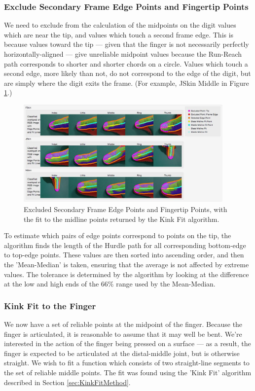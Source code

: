 \subsubsection{Exclude Secondary Frame Edge Points and Fingertip Points }\label{sec:ExcludeSecondaryFrameEdgePointsAndFingertipPoints}
We need to exclude from the calculation of the midpoints on the digit values which are near the tip, and values which touch a second frame edge. This is because values toward the tip --- given that the finger is not necessarily perfectly horizontally-aligned --- give unreliable midpoint values because the Run-Reach path corresponds to shorter and shorter chords on a circle. Values which touch a second edge, more likely than not, do not correspond to the edge of the digit, but are simply where the digit exits the frame. (For example, JSkin Middle in Figure \ref{fig:ExcludedEdgePointsAndMidlineFit}.)

\begin{figure}[h!]
  \centering
    \includegraphics[width=0.95\textwidth]{Chapter4/Figs/ExcludedEdgePointsAndMidlineFit.jpg}
    \caption{Excluded Secondary Frame Edge Points and Fingertip Points, with the fit to the midline points returned by the Kink Fit algorithm.}\label{fig:ExcludedEdgePointsAndMidlineFit}
\end{figure}

To estimate which pairs of edge points correspond to points on the tip, the algorithm finds the length of the Hurdle path for all corresponding bottom-edge to top-edge points. These values are then sorted into ascending order, and then the 'Mean-Median' is taken, ensuring that the average is not affected by extreme values. The tolerance is determined by the algorithm by looking at the difference at the low and high ends of the $66\%$ range used by the Mean-Median.

\subsubsection{Kink Fit to the Finger}\label{sec:KinkFitToTheFinger}
We now have a set of reliable points at the midpoint of the finger. Because the finger is articulated, it is reasonable to assume that it may well be bent. We're interested in the action of the finger being pressed on a surface --- as a result, the finger is expected to be articulated at the distal-middle joint, but is otherwise straight. We wish to fit a function which consists of two straight-line segments to the set of reliable middle points. The fit was found using the 'Kink Fit' algorithm described in Section \ref{sec:KinkFitMethod}.

